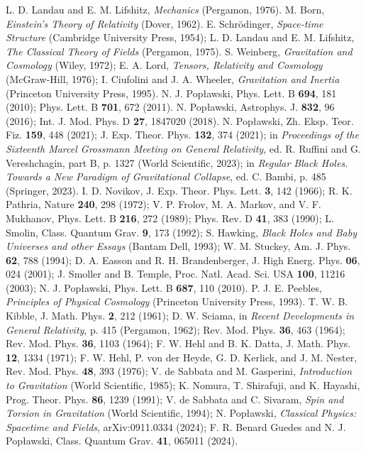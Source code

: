 \documentclass[prd,onecolumn,nofootinbib]{revtex4}
\begin{document}
\begin{thebibliography}{}
 L. D. Landau and E. M. Lifshitz, {\it Mechanics} (Pergamon, 1976).
 M. Born, {\em Einstein's Theory of Relativity} (Dover, 1962).
 E. Schr\"{o}dinger, {\it Space-time Structure} (Cambridge University Press, 1954); L. D. Landau and E. M. Lifshitz, {\it The Classical Theory of Fields} (Pergamon, 1975).
 S. Weinberg, {\em Gravitation and Cosmology} (Wiley, 1972); E. A. Lord, {\em Tensors, Relativity and Cosmology} (McGraw-Hill, 1976); I. Ciufolini and J. A. Wheeler, {\em Gravitation and Inertia} (Princeton University Press, 1995).
 N. J. Pop{\l}awski, Phys. Lett. B {\bf 694}, 181 (2010); Phys. Lett. B {\bf 701}, 672 (2011).
 N. Pop{\l}awski, Astrophys. J. {\bf 832}, 96 (2016); Int. J. Mod. Phys. D {\bf 27}, 1847020 (2018).
 N. Pop{\l}awski, Zh. Eksp. Teor. Fiz. {\bf 159}, 448 (2021); J. Exp. Theor. Phys. {\bf 132}, 374 (2021); in {\em Proceedings of the Sixteenth Marcel Grossmann Meeting on General Relativity}, ed. R. Ruffini and G. Vereshchagin, part B, p. 1327 (World Scientific,
2023); in {\em Regular Black Holes. Towards a New Paradigm of Gravitational Collapse}, ed. C. Bambi, p. 485 (Springer, 2023).
 I. D. Novikov, J. Exp. Theor. Phys. Lett. {\bf 3}, 142 (1966); R. K. Pathria, Nature {\bf 240}, 298 (1972); V. P. Frolov, M. A. Markov, and V. F. Mukhanov, Phys. Lett. B {\bf 216}, 272 (1989); Phys. Rev. D {\bf 41}, 383 (1990); L. Smolin, Class. Quantum Grav. {\bf 9}, 173 (1992); S. Hawking, {\it Black Holes and Baby Universes and other Essays} (Bantam Dell, 1993); W. M. Stuckey, Am. J. Phys. {\bf 62}, 788 (1994); D. A. Easson and R. H. Brandenberger, J. High Energ. Phys. {\bf 06}, 024 (2001); J. Smoller and B. Temple, Proc. Natl. Acad. Sci. USA {\bf 100}, 11216 (2003); N. J. Pop{\l}awski, Phys. Lett. B {\bf 687}, 110 (2010).
 P. J. E. Peebles, {\em Principles of Physical Cosmology} (Princeton University Press, 1993).
 T. W. B. Kibble, J. Math. Phys. {\bf 2}, 212 (1961); D. W. Sciama, in {\em Recent Developments in General Relativity}, p. 415 (Pergamon, 1962); Rev. Mod. Phys. {\bf 36}, 463 (1964); Rev. Mod. Phys. {\bf 36}, 1103 (1964); F. W. Hehl and B. K. Datta, J. Math. Phys. {\bf 12}, 1334 (1971); F. W. Hehl, P. von der Heyde, G. D. Kerlick, and J. M. Nester, Rev. Mod. Phys. {\bf 48}, 393 (1976); V. de Sabbata and M. Gasperini, {\it Introduction to Gravitation} (World Scientific, 1985); K. Nomura, T. Shirafuji, and K. Hayashi, Prog. Theor. Phys. {\bf 86}, 1239 (1991); V. de Sabbata and C. Sivaram, {\it Spin and Torsion in Gravitation} (World Scientific, 1994); N. Pop{\l}awski, {\em Classical Physics: Spacetime and Fields}, arXiv:0911.0334 (2024); F. R. Benard Guedes and N. J. Pop{\l}awski, Class. Quantum Grav. {\bf 41}, 065011 (2024).

\end{thebibliography}
\end{document}
